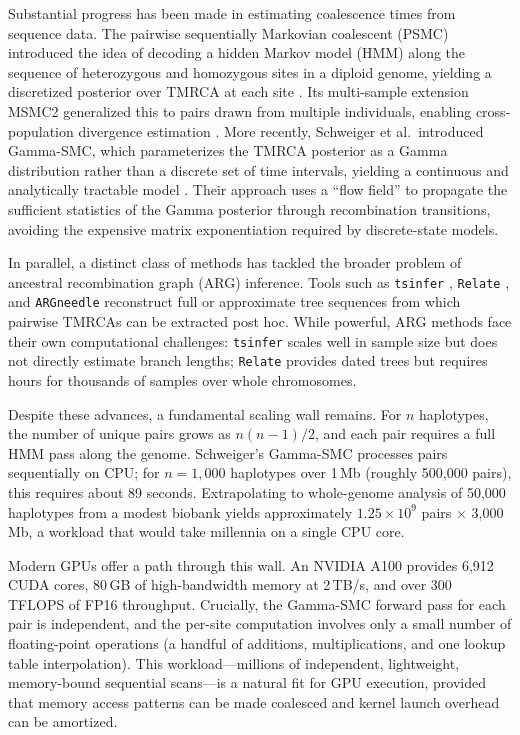 \documentclass[10pt,letterpaper]{article}
\begin{document}
Substantial progress has been made in estimating coalescence times from sequence data.
The pairwise sequentially Markovian coalescent (PSMC) introduced the idea of decoding a hidden Markov model (HMM) along the sequence of heterozygous and homozygous sites in a diploid genome, yielding a discretized posterior over TMRCA at each site \cite{Li2011}.
Its multi-sample extension MSMC2 generalized this to pairs drawn from multiple individuals, enabling cross-population divergence estimation \cite{Schiffels2014,Malaspinas2016}.
More recently, Schweiger et al.\ introduced Gamma-SMC, which parameterizes the TMRCA posterior as a Gamma distribution rather than a discrete set of time intervals, yielding a continuous and analytically tractable model \cite{Schweiger2023}.
Their approach uses a ``flow field'' to propagate the sufficient statistics of the Gamma posterior through recombination transitions, avoiding the expensive matrix exponentiation required by discrete-state models.

In parallel, a distinct class of methods has tackled the broader problem of ancestral recombination graph (ARG) inference.
Tools such as \texttt{tsinfer} \cite{Kelleher2019}, \texttt{Relate} \cite{Speidel2019}, and \texttt{ARGneedle} \cite{Zhang2023} reconstruct full or approximate tree sequences from which pairwise TMRCAs can be extracted post hoc.
While powerful, ARG methods face their own computational challenges: \texttt{tsinfer} scales well in sample size but does not directly estimate branch lengths; \texttt{Relate} provides dated trees but requires hours for thousands of samples over whole chromosomes.

Despite these advances, a fundamental scaling wall remains.
For $n$ haplotypes, the number of unique pairs grows as $n(n-1)/2$, and each pair requires a full HMM pass along the genome.
Schweiger's Gamma-SMC processes pairs sequentially on CPU; for $n=1{,}000$ haplotypes over 1\,Mb (roughly 500{,}000 pairs), this requires about 89 seconds.
Extrapolating to whole-genome analysis of 50{,}000 haplotypes from a modest biobank yields approximately $1.25 \times 10^9$ pairs $\times$ 3{,}000\,Mb, a workload that would take millennia on a single CPU core.

Modern GPUs offer a path through this wall.
An NVIDIA A100 provides 6{,}912 CUDA cores, 80\,GB of high-bandwidth memory at 2\,TB/s, and over 300 TFLOPS of FP16 throughput.
Crucially, the Gamma-SMC forward pass for each pair is independent, and the per-site computation involves only a small number of floating-point operations (a handful of additions, multiplications, and one lookup table interpolation).
This workload---millions of independent, lightweight, memory-bound sequential scans---is a natural fit for GPU execution, provided that memory access patterns can be made coalesced and kernel launch overhead can be amortized.
\end{document}
